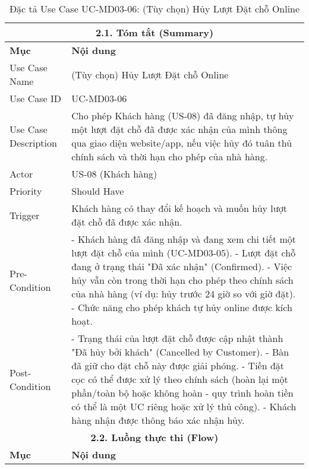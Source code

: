 \begin{longtable}{|m{4cm}|p{11cm}|}
\caption{Đặc tả Use Case UC-MD03-06: (Tùy chọn) Hủy Lượt Đặt chỗ Online} \label{tab:uc_md03_06_revised_v3} \\
\hline
\multicolumn{2}{|c|}{\textbf{2.1. Tóm tắt (Summary)}} \\
\hline
\textbf{Mục} & \textbf{Nội dung} \\
\hline
\endhead %
\hline
\endfoot %
\hline
\endlastfoot %
Use Case Name & (Tùy chọn) Hủy Lượt Đặt chỗ Online \\
\hline
Use Case ID & UC-MD03-06 \\
\hline
Use Case Description & Cho phép Khách hàng (US-08) đã đăng nhập, tự hủy một lượt đặt chỗ đã được xác nhận của mình thông qua giao diện website/app, nếu việc hủy đó tuân thủ chính sách và thời hạn cho phép của nhà hàng. \\
\hline
Actor & US-08 (Khách hàng) \\
\hline
Priority & Should Have \\
\hline
Trigger & Khách hàng có thay đổi kế hoạch và muốn hủy lượt đặt chỗ đã được xác nhận. \\
\hline
Pre-Condition & - Khách hàng đã đăng nhập và đang xem chi tiết một lượt đặt chỗ của mình (UC-MD03-05). \newline - Lượt đặt chỗ đang ở trạng thái "Đã xác nhận" (Confirmed). \newline - Việc hủy vẫn còn trong thời hạn cho phép theo chính sách của nhà hàng (ví dụ: hủy trước 24 giờ so với giờ đặt). \newline - Chức năng cho phép khách tự hủy online được kích hoạt. \\
\hline
Post-Condition & - Trạng thái của lượt đặt chỗ được cập nhật thành "Đã hủy bởi khách" (Cancelled by Customer). \newline - Bàn đã giữ cho đặt chỗ này được giải phóng. \newline - Tiền đặt cọc có thể được xử lý theo chính sách (hoàn lại một phần/toàn bộ hoặc không hoàn - quy trình hoàn tiền có thể là một UC riêng hoặc xử lý thủ công). \newline - Khách hàng nhận được thông báo xác nhận hủy. \\
\hline
\multicolumn{2}{|c|}{\textbf{2.2. Luồng thực thi (Flow)}} \\
\hline
\textbf{Mục} & \textbf{Nội dung} \\
\hline

\end{longtable}
